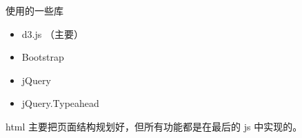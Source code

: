 

\begin{issues}
\issueDraft
\end{issues}

使用的一些库
\begin{itemize}
\item d3.js （主要）
\item Bootstrap
\item jQuery
\item jQuery.Typeahead
\end{itemize}

html 主要把页面结构规划好，但所有功能都是在最后的 js 中实现的。
